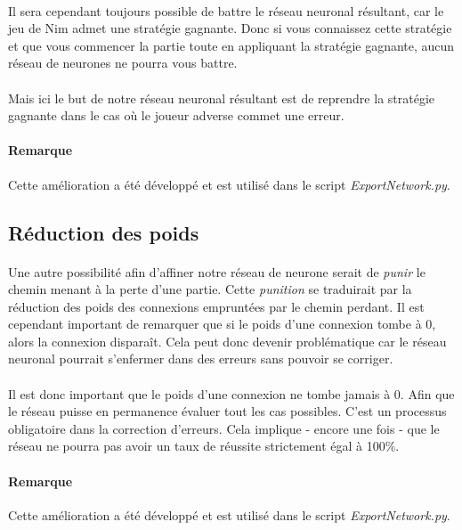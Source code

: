 \documentclass{article}
\begin{document}
  \paragraph{}
    Il sera cependant toujours possible de battre le réseau neuronal résultant, car le jeu de Nim admet une stratégie gagnante. Donc si vous connaissez cette stratégie
    et que vous commencer la partie toute en appliquant la stratégie gagnante, aucun réseau de neurones ne pourra vous battre.
  \paragraph{}
    Mais ici le but de notre réseau neuronal résultant est de reprendre la stratégie gagnante dans le cas où le joueur adverse commet une erreur.
    
  \paragraph{Remarque}
    Cette amélioration a été développé et est utilisé dans le script \emph{ExportNetwork.py}.
    
  \subsection{Réduction des poids}
  \paragraph{}
    Une autre possibilité afin d’affiner notre réseau de neurone serait de \emph{punir} le chemin menant à la perte d'une partie.
    Cette \emph{punition} se traduirait par la réduction des poids des connexions empruntées par le chemin perdant.
    Il est cependant important de remarquer que si le poids d'une connexion tombe à 0, alors la connexion disparaît. Cela peut donc devenir problématique
    car le réseau neuronal pourrait s'enfermer dans des erreurs sans pouvoir se corriger.
  \paragraph{}
    Il est donc important que le poids d'une connexion ne tombe jamais à 0. Afin que le réseau puisse en permanence évaluer tout les cas
    possibles. C'est un processus obligatoire dans la correction d'erreurs. Cela implique - encore une fois - que le réseau ne pourra pas avoir un taux de
    réussite strictement égal à 100\%.
  \paragraph{Remarque}
    Cette amélioration a été développé et est utilisé dans le script \emph{ExportNetwork.py}.
\end{document}
